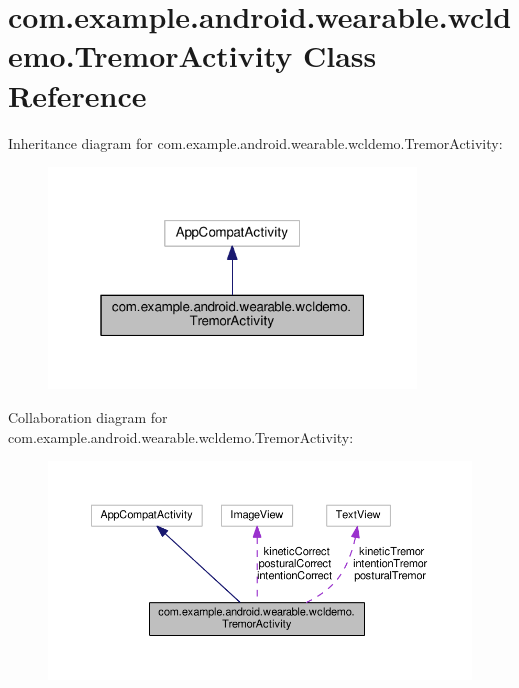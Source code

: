 \hypertarget{classcom_1_1example_1_1android_1_1wearable_1_1wcldemo_1_1TremorActivity}{}\section{com.\+example.\+android.\+wearable.\+wcldemo.\+Tremor\+Activity Class Reference}
\label{classcom_1_1example_1_1android_1_1wearable_1_1wcldemo_1_1TremorActivity}


Inheritance diagram for com.\+example.\+android.\+wearable.\+wcldemo.\+Tremor\+Activity\+:
\nopagebreak
\begin{figure}[H]
\begin{center}
\leavevmode
\includegraphics[width=277pt]{d6/dd4/classcom_1_1example_1_1android_1_1wearable_1_1wcldemo_1_1TremorActivity__inherit__graph}
\end{center}
\end{figure}


Collaboration diagram for com.\+example.\+android.\+wearable.\+wcldemo.\+Tremor\+Activity\+:
\nopagebreak
\begin{figure}[H]
\begin{center}
\leavevmode
\includegraphics[width=350pt]{dd/dfc/classcom_1_1example_1_1android_1_1wearable_1_1wcldemo_1_1TremorActivity__coll__graph}
\end{center}
\end{figure}
